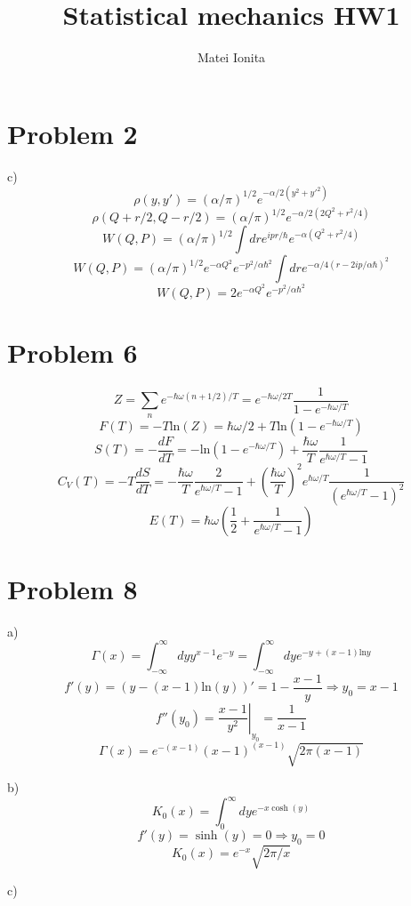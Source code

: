 \documentclass[12 pt]{article}
\title{Statistical mechanics HW1}
\author{Matei Ionita}
\begin{document}
  \maketitle

\section*{Problem 2}
c) \[      \rho(y,y') = (\alpha/\pi)^{1/2} e^{-\alpha/2 (y^2 + y'^2)}    \]
\[     \rho(Q+r/2, Q-r/2) =   (\alpha/\pi)^{1/2} e^{-\alpha/2 (2Q^2 + r^2/4)}   \]
\[    W(Q,P) =  (\alpha/\pi)^{1/2} \int dr e^{ipr/\hbar} e^{- \alpha (Q^2 + r^2/4)}      \]
\[     W(Q,P) =  (\alpha/\pi)^{1/2} e^{- \alpha Q^2} e^{-  p^2/\alpha\hbar^2} \int dr e^{- \alpha/4 (r - 2ip/\alpha \hbar)^2} \]
\[      W(Q,P) = 2  e^{- \alpha Q^2} e^{-  p^2/\alpha\hbar^2}    \]

\section*{Problem 6}
\[  Z = \sum_n e^{- \hbar \omega (n+ 1/2) /T} = e^{- \hbar \omega/2T} \frac{1}{1-e^{-\hbar \omega/T}}  \]
\[   F(T) = - T \text{ln}(Z) = \hbar\omega/2 + T \text{ln}(1- e^{-\hbar\omega/T})   \]
\[     S(T) = - \frac{dF}{dT} = - \text{ln}(1- e^{-\hbar\omega/T}) + \frac{\hbar\omega}{T} \frac{1}{e^{\hbar\omega/T} - 1}   \]
\[     C_V (T) = - T \frac{dS}{dT} = - \frac{\hbar\omega}{T} \frac{2}{e^{\hbar\omega/T} - 1} + \left(\frac{\hbar\omega}{T}\right)^2  e^{\hbar\omega/T} \frac{1}{(e^{\hbar\omega/T} - 1)^2}    \]
\[      E(T) = \hbar\omega \left( \frac{1}{2} + \frac{1}{e^{\hbar\omega/T} - 1}  \right)      \]


\section*{Problem 8}
a)
\[  \Gamma(x) = \int_{-\infty}^{\infty} dy y^{x-1} e^{-y} = \int_{-\infty}^{\infty} dy e^{-y+(x-1)\text{ln}y}  \]
\[      f'(y) = (y - (x-1)\text{ln}(y) )' = 1 - \frac{x-1}{y}   \Rightarrow y_0 = x-1    \]
\[       f''(y_0) =\left. \frac{x-1}{y^2} \right|_{y_0} = \frac{1}{x-1}   \]
\[      \Gamma(x) = e^{-(x-1)} (x-1)^{(x-1)} \sqrt{2\pi(x-1)}   \]

b) \[ K_0(x) = \int_0^{\infty} dy e^{-x \cosh(y)}\]
\[      f'(y)   = \sinh(y) = 0 \Rightarrow y_0 = 0  \]
\[       K_0(x) = e^{-x} \sqrt{2\pi/x}    \]

c) 
\end{document}
